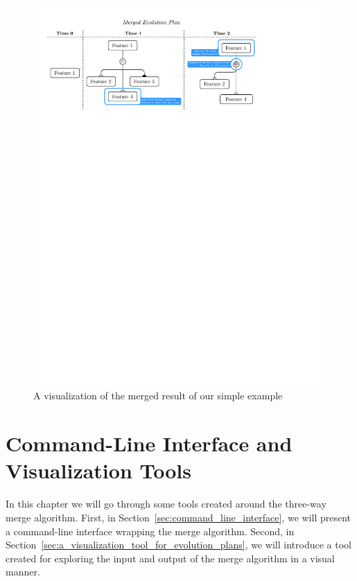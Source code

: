 \documentclass[a4paper,english]{ifimaster}
\begin{document}
\begin{figure}[htpb]
  \centering
  \includegraphics[width=\linewidth]{simple_merged_ep.pdf}
  \caption{A visualization of the merged result of our simple example}%
  \label{fig:simple_three_way_merged_result}
\end{figure}

\chapter{Command-Line Interface and Visualization Tools}%
\label{cha:command_line_interface_and_visualization_tools}

In this chapter we will go through some tools created around the three-way merge algorithm. First, in Section~\ref{sec:command_line_interface}, we will present a command-line interface wrapping the merge algorithm. Second, in Section~\ref{sec:a_visualization_tool_for_evolution_plans}, we will introduce a tool created for exploring the input and output of the merge algorithm in a visual manner.
\end{document}
